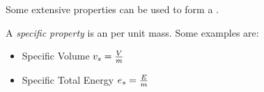 Some extensive properties can be used to form a .
\begin{definition}\label{def:Specific_Property}
  A \emph{specific property} is an  per unit mass.
  Some examples are:
  \begin{itemize}[noitemsep]
  \item Specific Volume $v_{s} = \frac{V}{m}$
  \item Specific Total Energy $e_{s} = \frac{E}{m}$
  \end{itemize}
\end{definition}



